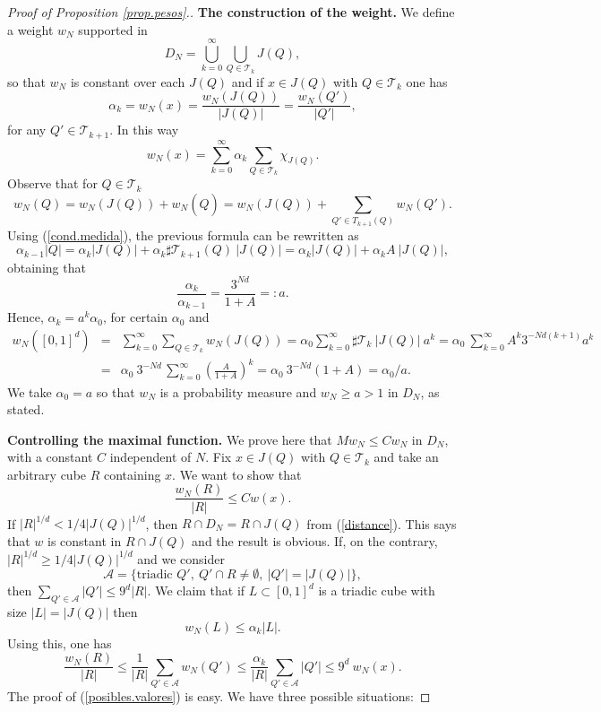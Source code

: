 \documentclass[11pt]{amsart}
\theoremstyle{definition}
\begin{document}
\begin{proof}[Proof of Proposition \ref{prop.pesos}.]
\bigskip

\textbf{The construction of the weight.} We define a weight $w_N$ supported in 
$$D_N = \bigcup_{k=0}^\infty \bigcup_{Q\in \mathcal T_k} J(Q),$$
 so that $w_N$ is constant over each $J(Q)$ and if $x\in J(Q)$ with $Q\in \mathcal T_{k}$ one has
\begin{equation}\label{cond.medida}
\alpha_{k} = w_N(x) = \frac{w_N(J(Q))}{|J(Q)|} = \frac{w_N(Q')}{|Q'|},
\end{equation}
for any $Q'\in \mathcal T_{k+1}$. In this way
\[
w_N(x)=\sum_{k=0}^\infty \alpha_k\sum_{Q\in \mathcal T_k} \chi_{J(Q)}.
\]
Observe that for $Q\in \mathcal T_k$
\[
w_N(Q)=w_N(J(Q))+w_N(\widehat{Q})=w_N(J(Q))+\sum_{Q'\in T_{k+1}(Q)} w_N(Q').
\]
Using (\ref{cond.medida}), the previous formula can be rewritten as 
\[
\alpha_{k-1} |Q| = \alpha_{k} |J(Q)|+\alpha_{k}\sharp\mathcal T_{k+1}(Q)\ |J(Q)| = \alpha_{k} |J(Q)|+\alpha_{k}A\ |J(Q)|,
\]
obtaining that
\[
\frac{\alpha_{k}}{\alpha_{k-1}}=\frac{3^{Nd}}{1+A}=:a.
\]
Hence, $\alpha_k=a^k\alpha_0$, for certain $\alpha_0$ and
\begin{eqnarray*}
w_N([0,1]^d)&=&\sum_{k=0}^\infty \sum_{Q\in\mathcal T_k} w_N(J(Q))= \alpha_0 \sum_{k=0}^\infty \sharp \mathcal T_k\  |J(Q)|\ a^k = \alpha_0\ \sum_{k=0}^\infty A^k 3^{-Nd(k+1)}a^k \\&=& \alpha_0\ 3^{-Nd}\,\sum_{k=0}^\infty \left( \frac{A}{1+A}\right)^k = \alpha_0\ 3^{-Nd}(1+A)=\alpha_0/a.
\end{eqnarray*}
We take $\alpha_0=a$ so that $w_N$ is a probability measure and $w_N\geq a>1$ in $D_N$, as stated.

\bigskip

\textbf{Controlling the maximal function.} We prove here that $Mw_N \leq Cw_N$ in $D_N$, with a constant $C$ independent of $N$. Fix $x\in J(Q)$ with $Q\in \mathcal T_k$ and take an arbitrary cube $R$ containing $x$. We want to show that 
$$\displaystyle \frac{w_N(R)}{|R|}\le Cw(x).$$
If  $|R|^{1/d} < 1/4|J(Q)|^{1/d}$, then $R\cap D_N=R\cap J(Q)$ from (\ref{distance}). This says that $w$ is constant in $R\cap J(Q)$ and the result is obvious. If, on the contrary, $|R|^{1/d}\geq 1/4|J(Q)|^{1/d}$ and we consider
\[
\mathcal A=\{ \mbox{triadic } Q',\ Q'\cap R\neq \emptyset,\ |Q'|=|J(Q)|\},
\]
then  $\sum_{Q'\in \mathcal A} |Q'|\leq 9^d |R|$. We claim that 
if $L\subset [0,1]^d$ is a triadic cube with size $|L|=|J(Q)|$ then
\begin{equation}\label{posibles.valores}
w_N(L) \leq \alpha_k |L|. 
\end{equation}
Using this, one has
\[
\frac{w_N(R)}{|R|}\leq \frac{1}{|R|}\sum_{Q'\in \mathcal A} w_N(Q')\leq  \frac{{\alpha_{k}}}{|R|}\sum_{Q'\in \mathcal A} |Q'| \leq 9^d\ w_N(x).
\]
The proof of (\ref{posibles.valores}) is easy. We have three possible situations: 


\end{proof}
\end{document}
